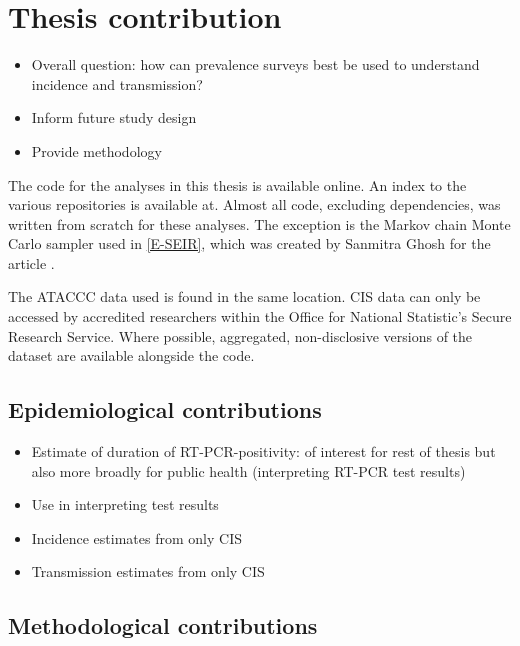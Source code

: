 \documentclass[thesis.tex]{subfiles}
\begin{document}
\section{Thesis contribution}

\begin{itemize}
    \item Overall question: how can prevalence surveys best be used to understand incidence and transmission?
    \item Inform future study design
    \item Provide methodology
\end{itemize}

The code for the analyses in this thesis is available online.
An index to the various repositories is available at.
Almost all code, excluding dependencies, was written from scratch for these analyses.
The exception is the Markov chain Monte Carlo sampler used in \cref{E-SEIR}, which was created by Sanmitra Ghosh for the article \textcite{ghoshApproximate}.

The ATACCC data used is found in the same location.
CIS data can only be accessed by accredited researchers within the Office for National Statistic's Secure Research Service.
Where possible, aggregated, non-disclosive versions of the dataset are available alongside the code.

\subsection{Epidemiological contributions}

\begin{itemize}
    \item Estimate of duration of RT-PCR-positivity: of interest for rest of thesis but also more broadly for public health (\eg interpreting RT-PCR test results)
    \item Use in interpreting test results
    \item Incidence estimates from only CIS
    \item Transmission estimates from only CIS
\end{itemize}

\subsection{Methodological contributions}
\end{document}
